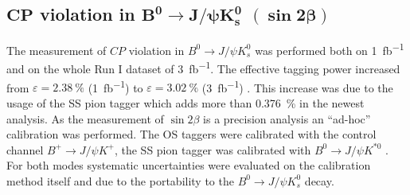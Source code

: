 \documentclass{PoS}
\begin{document}
%

\subsection{$\bm{C\!P}$ violation in $\bm{B^0}\bm{\to} \bm{J\!/\!\psi K_s^0}$ $\pmb{(\sin 2\beta)}$}

The measurement of $C\!P$ violation in $B^0\to J\!/\!\psi K_s^0$ was performed both on \SI{1}{fb^{-1}} and on the whole Run I dataset of \SI{3}{fb^{-1}}. The effective tagging power increased from $\varepsilon=\SI{2.38}{\%}$ (\SI{1}{fb^{-1}}) \cite{9} to $\varepsilon=\SI{3.02}{\%}$ (\SI{3}{fb^{-1}}) \cite{10}. This increase was due to the usage of the SS pion tagger which adds more than \SI{0.376}{\%} in the newest analysis. As the measurement of $\sin 2\beta$ is a precision analysis an \enquote{ad-hoc} calibration was performed. The OS taggers were calibrated with the control channel $B^+\to J\!/\!\psi K^+$, the SS pion tagger was calibrated with $B^0\to J\!/\!\psi K^{*0}$ . For both modes systematic uncertainties were evaluated on the calibration method itself and due to the portability to the \mbox{$B^0\to J\!/\!\psi K_s^0$} decay. 
\end{document}
